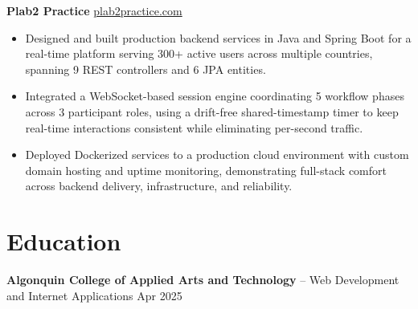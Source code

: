 \documentclass[11pt]{article}       %
\begin{document}
\textbf{Plab2 Practice} \hfill \href{https://plab2practice.com}{plab2practice.com} \\
\vspace{-9pt}
\begin{itemize}
  \item Designed and built production backend services in Java and Spring Boot for a real-time platform serving 300+ active users across multiple countries, spanning 9 REST controllers and 6 JPA entities.
  \item Integrated a WebSocket-based session engine coordinating 5 workflow phases across 3 participant roles, using a drift-free shared-timestamp timer to keep real-time interactions consistent while eliminating per-second traffic.
  \item Deployed Dockerized services to a production cloud environment with custom domain hosting and uptime monitoring, demonstrating full-stack comfort across backend delivery, infrastructure, and reliability.
\end{itemize}





\section*{Education}
\textbf{Algonquin College of Applied Arts and Technology} -- Web Development and Internet Applications
\hfill Apr 2025 \\
\end{document}
